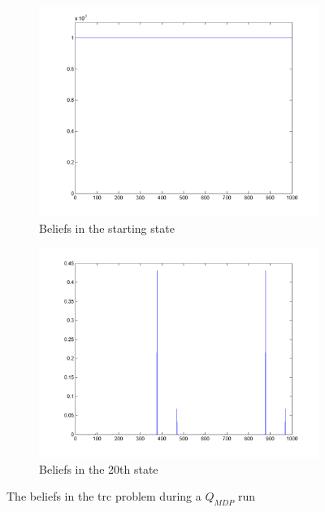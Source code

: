 \documentclass[10pt,a4paper]{article}
\begin{document}
\begin{figure}
        \centering
        \begin{subfigure}{0.48\textwidth}
        		\includegraphics[width=\textwidth]{Paths/trc/plot-QMDP-bel-1-8790226525.png}
                \caption{Beliefs in the starting state}
                \label{fig:bel_qmdp_trc_part1}
                \hspace{10pt}
        \end{subfigure}
        \quad
        \begin{subfigure}{0.48\textwidth}
        		\includegraphics[width=\textwidth]{Paths/trc/plot-QMDP-bel-2-8790226525.png}
                \caption{Beliefs in the 20th state}
                \label{fig:bel_qmdp_trc_part2}
                \hspace{-10pt}
        \end{subfigure}
        \caption{The beliefs in the trc problem during a $Q_{MDP}$ run}
        \label{fig:bel_trc_QMDP}
\end{figure}
\end{document}
